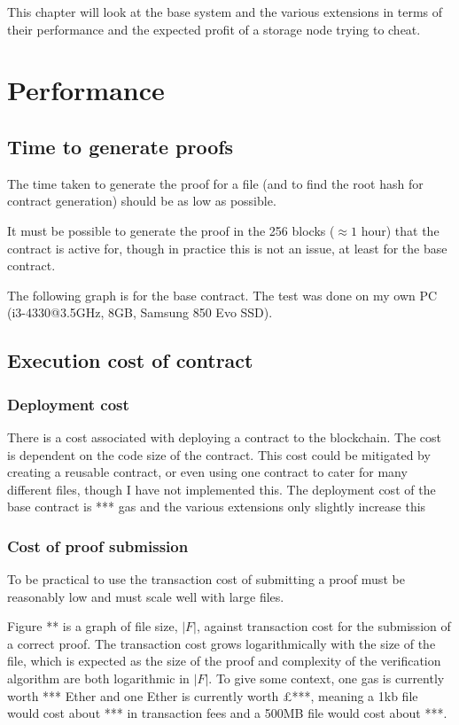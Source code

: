 \documentclass[12pt,a4paper,twoside,openright]{report}
\begin{document}
This chapter will look at the base system and the various extensions in terms of their performance and the expected profit of a
storage node trying to cheat.

\section{Performance}


\subsection{Time to generate proofs}

The time taken to generate the proof for a file (and to find the root hash for contract generation) should be as low as possible.

It must be possible to generate the proof in the 256 blocks ($\approx 1$ hour)  that the contract is active for,
though in practice this is not an issue, at least for the base contract.

The following graph is for the base contract.
The test was done on my own PC (i3-4330@3.5GHz, 8GB, Samsung 850 Evo SSD).

\subsection{Execution cost of contract}

\subsubsection{Deployment cost}

There is a cost associated with deploying a contract to the blockchain.
The cost is dependent on the code size of the contract.
This cost could be mitigated by creating a reusable contract, or even using one contract to cater for many different files, though I have not implemented this.
The deployment cost of the base contract is *** gas and the various extensions only slightly increase this

\subsubsection{Cost of proof submission}

To be practical to use the transaction cost of submitting a proof must be reasonably low
and must scale well with large files.

Figure ** is a graph of file size, $|F|$, against transaction cost for the submission of a correct proof.
The transaction cost grows logarithmically with the size of the file, which is expected as the size of the proof and complexity of the verification algorithm are both logarithmic in $|F|$.
To give some context, one gas is currently worth *** Ether and one Ether is currently worth £***, meaning a 1kb file would cost about *** in transaction fees and
a 500MB file would cost about ***.
\end{document}
